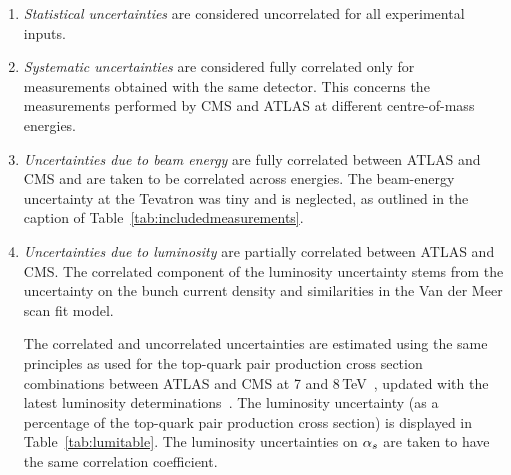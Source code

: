 \begin{enumerate}
\item \textit{Statistical uncertainties} are considered uncorrelated
  for all experimental inputs.

\item \textit{Systematic uncertainties} are considered fully
  correlated only for measurements obtained with the same
  detector. This concerns the measurements performed by CMS and ATLAS
  at different centre-of-mass energies.

\item \textit{Uncertainties due to beam energy} are fully correlated
  between ATLAS and CMS and are taken to be correlated across
  energies.
  The beam-energy uncertainty at the Tevatron was tiny and is
  neglected, as outlined in the caption of
  Table~\ref{tab:includedmeasurements}. 

\item
    \textit{Uncertainties due to luminosity} are partially correlated between
    ATLAS and CMS. The correlated component of the luminosity uncertainty
    stems from the uncertainty on the bunch current density and
    similarities in the Van der Meer scan fit model.

    The correlated and uncorrelated uncertainties are estimated using the same
    principles as used for the top-quark pair production cross section combinations
    between ATLAS and CMS at 7 and
    8\,TeV~\cite{topcombination_7TeV,topcombination_8TeV}, updated
    with the latest luminosity
    determinations~\cite{Aad:2013ucp,Aaboud:2016hhf,CMS:2012rua,CMS:2013gfa,CMS:2016eto}.
    The luminosity uncertainty (as a percentage of the top-quark pair
    production cross section) is displayed in Table~\ref{tab:lumitable}.
    The luminosity uncertainties on $\alpha_s$ are taken to have the same correlation
    coefficient.


\end{enumerate}
